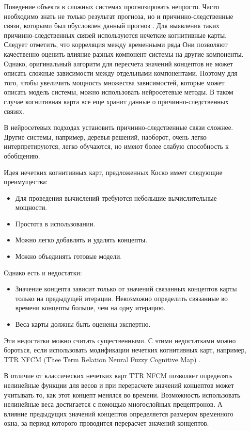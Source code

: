 Поведение объекта в сложных системах прогнозировать непросто.
Часто необходимо знать не только результат прогноза,
но и причинно-следственные связи, которыми был обусловлен данный прогноз
\cite{osoba2019dags} \cite{efficient_fcms}.
Для выявления таких причинно-следственных связей используются нечеткие когнитивные карты.
Следует отметить, что корреляция между временными ряда
Они позволяют качественно оценить влияние разных компонент системы на другие компоненты.
Однако, оригинальный алгоритм для пересчета значений концептов
не может описать сложные зависимости между отдельными компонентами.
Поэтому для того, чтобы увеличить мощность множества зависимостей, которые
может описать модель системы, можно использовать нейросетевые методы.
В таком случае когнитивная карта все еще хранит данные о причинно-следственных связях.

В нейросетевых подходах установить причинно-следственные связи сложнее.
Другие системы, например, деревья решений, наоборот, очень легко интерпретируются, легко обучаются,
но имеют более слабую способность к обобщению.

Идея нечетких когнитивных карт, предложенных Коско \cite{kosko1986fuzzy} имеет следующие преимущества:

\begin{itemize}
	\item Для проведения вычислений требуются небольшие вычислительные мощности.
	\item Простота в использовании.
	\item Можно легко добавлять и удалять концепты.
	\item Можно объединять готовые модели.
\end{itemize}

Однако есть и недостатки:

\begin{itemize}
	\item Значение концепта зависит только от значений связанных концептов карты только на предыдущей итерации.
	Невозможно определить связанные во времени концепты больше, чем на одну итерацию.
	\item Веса карты должны быть оценены экспертно.
\end{itemize}

Эти недостатки можно считать существенными.
С этими недостатками можно бороться, если использовать модификации нечетких когнитивных карт,
например, TTR NFCM (Thee Term Relation Neural Fuzzy Cognitive Map) \cite{threeTermNfcm}.

В отличие от классических нечетких карт TTR NFCM позволяет
определять нелинейные функции для весов и при перерасчете значений концептов может учитывать то, как
этот концепт менялся во времени. Возможность использовать нелинейные веса достигается с помощью многослойных прецептронов.
А влияние предыдущих значений концептов определяется размером временного окна, за период которого проводится перерасчет
значений концептов.


